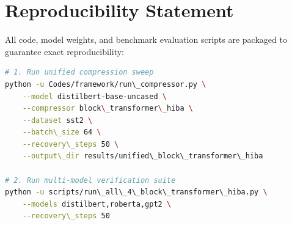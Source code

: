 \section{Reproducibility Statement}
All code, model weights, and benchmark evaluation scripts are packaged to guarantee exact reproducibility:
\begin{lstlisting}[language=bash]
# 1. Run unified compression sweep
python -u Codes/framework/run\_compressor.py \
    --model distilbert-base-uncased \
    --compressor block\_transformer\_hiba \
    --dataset sst2 \
    --batch\_size 64 \
    --recovery\_steps 50 \
    --output\_dir results/unified\_block\_transformer\_hiba

# 2. Run multi-model verification suite
python -u scripts/run\_all\_4\_block\_transformer\_hiba.py \
    --models distilbert,roberta,gpt2 \
    --recovery\_steps 50
\end{lstlisting}
